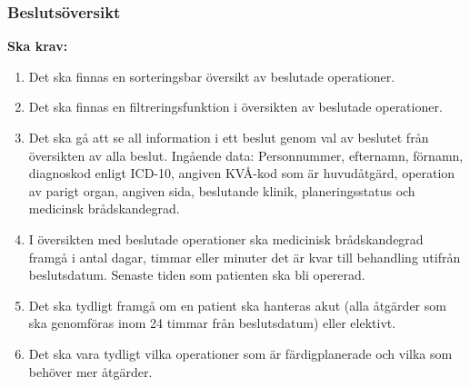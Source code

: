 \documentclass{article}
\begin{document}
\subsubsection{Beslutsöversikt}
\textbf{Ska krav: }
\begin{enumerate}
  \item Det ska finnas en sorteringsbar översikt av beslutade operationer.
  \item Det ska finnas en filtreringsfunktion i översikten av beslutade
  operationer.
  \item Det ska gå att se all information i ett beslut genom val av
  beslutet från översikten av alla beslut.
  Ingående data:
  Personnummer, efternamn, förnamn, diagnoskod enligt ICD-10, angiven KVÅ-kod
  som är huvudåtgärd, operation av parigt organ, angiven sida, beslutande
  klinik, planeringsstatus och medicinsk brådskandegrad.
  \item I översikten med beslutade operationer ska medicinisk brådskandegrad
  framgå i antal dagar, timmar eller minuter det är kvar till behandling utifrån
  beslutsdatum. Senaste tiden som patienten ska bli opererad.
  \item Det ska tydligt framgå om en patient ska hanteras akut (alla åtgärder
  som ska genomföras inom 24 timmar från beslutsdatum) eller elektivt.
  \item Det ska vara tydligt vilka operationer som är färdigplanerade och vilka
  som behöver mer åtgärder.
\end{enumerate}
\end{document}
